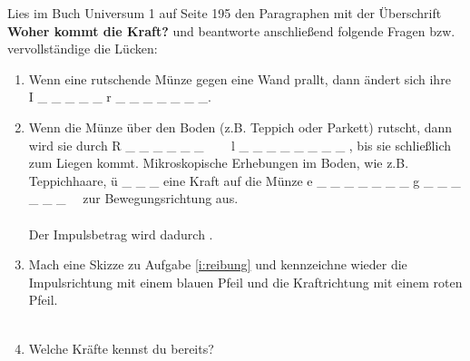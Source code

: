 \documentclass[task=1]{exercise}
\begin{document}
  Lies im Buch Universum 1 auf Seite 195 den Paragraphen mit der \"Uberschrift {\bfseries Woher kommt die Kraft?} und beantworte anschlie{\ss}end folgende Fragen bzw. vervollst\"andige die L\"ucken:
  \begin{enumerate}[label=\textnormal{\alph*)}]
    \item Wenn eine rutschende M\"unze gegen eine Wand prallt, dann \"andert sich ihre\\
    I \_ \_ \_ \_ \_ r \_ \_ \_ \_ \_ \_ \_.
    \item\label{i:reibung} Wenn die M\"unze \"uber den Boden (z.B. Teppich oder Parkett) rutscht, dann wird sie durch R \_ \_ \_ \_ \_ \_ ~~~ l \_ \_ \_ \_ \_ \_ \_ \_ , bis sie schlie{\ss}lich zum Liegen kommt.
    Mikroskopische Erhebungen im Boden, wie z.B. Teppichhaare, \"u \_ \_ \_ eine Kraft auf die M\"unze e \_ \_ \_ \_ \_ \_ \_ g \_ \_ \_ \_ \_ \_ ~~zur Bewegungsrichtung aus.\\~\\
    Der Impulsbetrag wird dadurch \luecke{3cm}.
    \item Mach eine Skizze zu Aufgabe \ref{i:reibung} und kennzeichne wieder die Impulsrichtung mit einem blauen Pfeil und die Kraftrichtung mit einem roten Pfeil.\\\vspace{2cm}\\
    \item Welche Kr\"afte kennst du bereits?\\\vspace{2cm}\\
  \end{enumerate}
  
  \newpage
  
\end{document}
